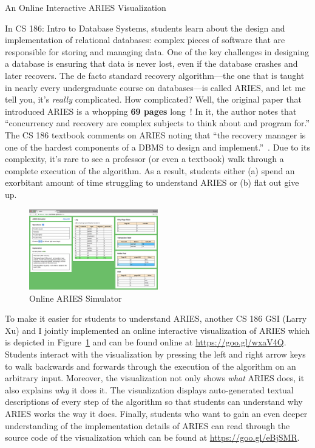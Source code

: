 \documentclass[12pt]{article}
\begin{document}
\begin{center}
  {\Large An Online Interactive ARIES Visualization}
\end{center}

In CS 186: Intro to Database Systems, students learn about the design and
implementation of relational databases: complex pieces of software that are
responsible for storing and managing data. One of the key challenges in
designing a database is ensuring that data is never lost, even if the database
crashes and later recovers. The de facto standard recovery algorithm---the one
that is taught in nearly every undergraduate course on databases---is called
ARIES, and let me tell you, it's \emph{really} complicated. How complicated?
Well, the original paper that introduced ARIES is a whopping \textbf{69 pages}
long~\cite{mohan1992aries}! In it, the author notes that ``concurrency and
recovery are complex subjects to think about and program for.'' The CS 186
textbook comments on ARIES noting that ``the recovery manager is one of the
hardest components of a DBMS to design and
implement.''~\cite{ramakrishnan2000database}. Due to its complexity, it's rare
to see a professor (or even a textbook) walk through a complete execution of
the algorithm. As a result, students either (a) spend an exorbitant amount of
time struggling to understand ARIES or (b) flat out give up.

\begin{figure}
  \centering
  \includegraphics[width=0.5\textwidth]{aries.png}
  \caption{Online ARIES Simulator}\label{LarrysAries}
\end{figure}

To make it easier for students to understand ARIES, another CS 186 GSI (Larry
Xu) and I jointly implemented an online interactive visualization of ARIES
which is depicted in Figure~\ref{LarrysAries} and can be found online at
\url{https://goo.gl/wxaV4Q}. Students interact with the visualization by
pressing the left and right arrow keys to walk backwards and forwards through
the execution of the algorithm on an arbitrary input. Moreover, the
visualization not only shows \emph{what} ARIES does, it also explains
\emph{why} it does it. The visualization displays auto-generated textual
descriptions of every step of the algorithm so that students can understand why
ARIES works the way it does. Finally, students who want to gain an even deeper
understanding of the implementation details of ARIES can read through the
source code of the visualization which can be found at
\url{https://goo.gl/eBjSMR}.
\end{document}
